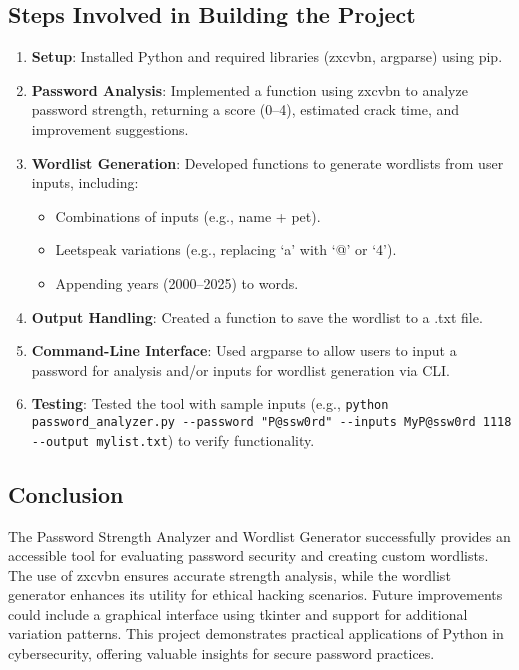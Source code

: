 \documentclass[a4paper,12pt]{article}
\begin{document}
\subsection*{Steps Involved in Building the Project}
\begin{enumerate}
    \item \textbf{Setup}: Installed Python and required libraries (zxcvbn, argparse) using pip.
    \item \textbf{Password Analysis}: Implemented a function using zxcvbn to analyze password strength, returning a score (0--4), estimated crack time, and improvement suggestions.
    \item \textbf{Wordlist Generation}: Developed functions to generate wordlists from user inputs, including:
        \begin{itemize}
            \item Combinations of inputs (e.g., name + pet).
            \item Leetspeak variations (e.g., replacing `a' with `@' or `4').
            \item Appending years (2000--2025) to words.
        \end{itemize}
    \item \textbf{Output Handling}: Created a function to save the wordlist to a .txt file.
    \item \textbf{Command-Line Interface}: Used argparse to allow users to input a password for analysis and/or inputs for wordlist generation via CLI.
    \item \textbf{Testing}: Tested the tool with sample inputs (e.g., \verb|python password_analyzer.py --password "P@ssw0rd" --inputs MyP@ssw0rd 1118 --output mylist.txt|) to verify functionality.
\end{enumerate}

\subsection*{Conclusion}
The Password Strength Analyzer and Wordlist Generator successfully provides an accessible tool for evaluating password security and creating custom wordlists. The use of zxcvbn ensures accurate strength analysis, while the wordlist generator enhances its utility for ethical hacking scenarios. Future improvements could include a graphical interface using tkinter and support for additional variation patterns. This project demonstrates practical applications of Python in cybersecurity, offering valuable insights for secure password practices.
\end{document}
